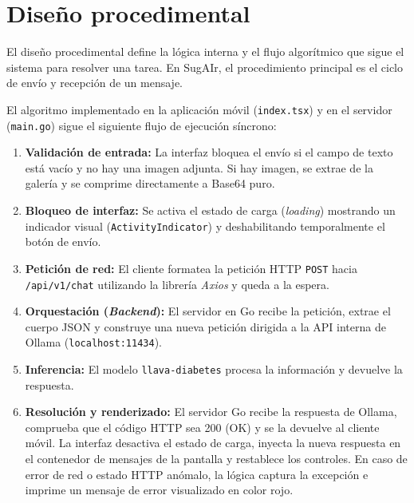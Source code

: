 \section{Diseño procedimental}
El diseño procedimental define la lógica interna y el flujo algorítmico que sigue el sistema para resolver una tarea. En SugAIr, el procedimiento principal es el ciclo de envío y recepción de un mensaje. 

El algoritmo implementado en la aplicación móvil (\texttt{index.tsx}) y en el servidor (\texttt{main.go}) sigue el siguiente flujo de ejecución síncrono:

\begin{enumerate}
    \item \textbf{Validación de entrada:} La interfaz bloquea el envío si el campo de texto está vacío y no hay una imagen adjunta. Si hay imagen, se extrae de la galería y se comprime directamente a Base64 puro.
    \item \textbf{Bloqueo de interfaz:} Se activa el estado de carga (\textit{loading}) mostrando un indicador visual (\texttt{ActivityIndicator}) y deshabilitando temporalmente el botón de envío.
    \item \textbf{Petición de red:} El cliente formatea la petición HTTP \texttt{POST} hacia \texttt{/api/v1/chat} utilizando la librería \textit{Axios} y queda a la espera.
    \item \textbf{Orquestación (\textit{Backend}):} El servidor en Go recibe la petición, extrae el cuerpo JSON y construye una nueva petición dirigida a la API interna de Ollama (\texttt{localhost:11434}).
    \item \textbf{Inferencia:} El modelo \texttt{llava-diabetes} procesa la información y devuelve la respuesta.
    \item \textbf{Resolución y renderizado:} El servidor Go recibe la respuesta de Ollama, comprueba que el código HTTP sea 200 (OK) y se la devuelve al cliente móvil. La interfaz desactiva el estado de carga, inyecta la nueva respuesta en el contenedor de mensajes de la pantalla y restablece los controles. En caso de error de red o estado HTTP anómalo, la lógica captura la excepción e imprime un mensaje de error visualizado en color rojo.
\end{enumerate}

